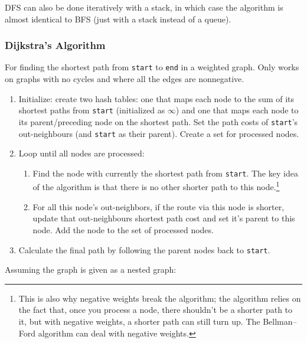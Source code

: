 \documentclass[table, xcdraw]{article}%
\begin{document}
DFS can also be done iteratively with a stack, in which case the algorithm is almost identical to BFS (just with a stack instead of a queue).

\subsubsection{Dijkstra's Algorithm}

For finding the shortest path from \texttt{start} to \texttt{end} in a weighted graph. Only works on graphs with no cycles and where all the edges are nonnegative.

\begin{enumerate}
    \item Initialize: create two hash tables: one that maps each node to the sum of its shortest paths from \texttt{start} (initialized as $\infty$) and one that maps each node to its parent/preceding node on the shortest path. Set the path costs of \texttt{start}'s out-neighbours (and \texttt{start} as their parent). Create a set for processed nodes.
    \item Loop until all nodes are processed:
    \begin{enumerate}
        \item Find the node with currently the shortest path from \texttt{start}. The key idea of the algorithm is that there is no other shorter path to this node.\footnote{This is also why negative weights break the algorithm; the algorithm relies on the fact that, once you process a node, there shouldn't be a shorter path to it, but with negative weights, a shorter path can still turn up. The Bellman–Ford algorithm can deal with negative weights.}
        \item For all this node's out-neighbors, if the route via this node is shorter, update that out-neighbours shortest path cost and set it's parent to this node. Add the node to the set of processed nodes.
    \end{enumerate}
    \item Calculate the final path by following the parent nodes back to \texttt{start}.
\end{enumerate}

Assuming the graph is given as a nested graph:
\end{document}
